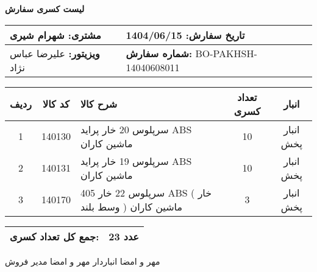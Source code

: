 \documentclass[a4paper,12pt]{article}
\begin{document}
\begin{center}
    {\Huge \textbf{   لیست کسری سفارش   }} \\
\end{center}

\vspace{0.5cm}

\noindent
\begin{tabular}{|p{7cm}|p{7cm}|}
\hline
\textbf{مشتری:} شهرام شیری & \textbf{تاریخ سفارش:} 1404/06/15 \\
\hline
\textbf{ویزیتور:} علیرضا عباس نژاد & \textbf{شماره سفارش:} BO-PAKHSH-14040608011 \\
\hline
\end{tabular}

\vspace{0.5cm}

\begin{longtable}{|c|c|p{6cm}|c|c|}
\hline
\rowcolor{headerblue} \color{white}
\textbf{ردیف} &  \textbf{کد کالا} & \textbf{شرح کالا} & \textbf{تعداد کسری} & \textbf{انبار} \\
\hline
\endhead
1 & 140130 & سرپلوس 20 خار پرايد ABS ماشين کاران & 10 & انبار پخش \\
\hline
2 & 140131 & سرپلوس 19 خار پرايد ABS ماشين کاران & 10 & انبار پخش \\
\hline
3 & 140170 & سرپلوس 22 خار 405 ABS ( خار وسط بلند ) ماشين کاران & 3 & انبار پخش \\
\hline

\end{longtable}

\vspace{0.3cm}
\noindent
\begin{tabular}{|p{7cm}|p{7cm}|}
\hline
\textbf{جمع کل تعداد کسری:} & 23 عدد \\
\hline
\end{tabular}

\vspace{1.5cm}

\noindent
مهر و امضا انباردار \hspace{8cm} مهر و امضا مدیر فروش
\end{document}
